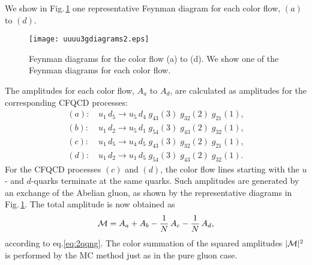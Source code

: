 \documentclass[a4paper,11pt]{article}
\begin{document}
We show in Fig.\,\ref{fig:abcd} one representative Feynman diagram for
each color flow, $(a)$ to $(d)$.
\begin{figure}
\begin{center}
\texttt{[image: uuuu3gdiagrams2.eps]}
\caption{Feynman diagrams for the color flow (a) to (d). We show one of the
 Feynman diagrams for each color flow.}
\label{fig:abcd}
\end{center}
\end{figure}
The amplitudes for each color flow, $A_a$ to $A_d$, are calculated as
amplitudes for the corresponding CFQCD processes:
\begin{subequations}
\begin{align}
 (a):&\,u_1\,d_5\rightarrow u_5\,d_4 \;g_{43}(3) \;g_{32}(2) \;g_{21}(1),\\
 (b):&\,u_1\,d_2\rightarrow u_5\,d_1 \;g_{54}(3) \;g_{43}(2) \;g_{32}(1),\\
 (c):&\,u_1\,d_5\rightarrow u_4\,d_5 \;g_{43}(3) \;g_{32}(2) \;g_{21}(1),\\
 (d):&\,u_1\,d_2\rightarrow u_1\,d_5 \;g_{54}(3) \;g_{43}(2) \;g_{32}(1).
\end{align}
\end{subequations}
For the CFQCD processes $(c)$ and $(d)$, the color flow lines starting
with the $u$- and $d$-quarks terminate at the same quarks. Such amplitudes are generated
by an exchange of the Abelian gluon, as shown by the
representative diagrams in Fig.\,\ref{fig:abcd}. The total amplitude is
now obtained as
\begin{equation}
 {\cal M}=A_a+A_b-\frac{1}{N}\,A_c-\frac{1}{N}\,A_d,
\end{equation}
according to eq.\eqref{eq:2qqng}. The color summation of the squared
amplitudes $|{\cal M}|^2$ is performed by the MC method just as in the pure gluon case.
\end{document}
